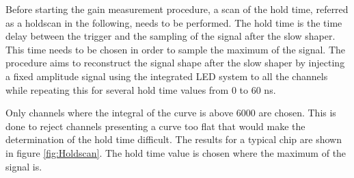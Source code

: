 Before starting the gain measurement procedure, a scan of the hold time, referred as a holdscan in the following, needs to be performed. The hold time is the time delay between the trigger and the sampling of the signal after the slow shaper. This time needs to be chosen in order to sample the maximum of the signal. The procedure aims to reconstruct the signal shape after the slow shaper by injecting a fixed amplitude signal using the integrated LED system to all the channels while repeating this for several hold time values from 0 to 60 ns.

Only channels where the integral of the curve is above 6000 are chosen. This is done to reject channels presenting a curve too flat that would make the determination of the hold time difficult. The results for a typical chip are shown in figure \ref{fig:Holdscan}. The hold time value is chosen where the maximum of the signal is.

